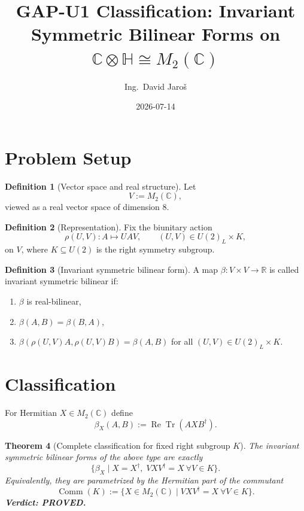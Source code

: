 \documentclass[12pt,a4paper]{article}
\title{GAP-U1 Classification: Invariant Symmetric Bilinear Forms on $\mathbb C\otimes\mathbb H\cong M_2(\mathbb C)$}
\author{Ing.\ David Jaroš}
\date{2026-07-14}
\newtheorem{theorem}{Theorem}[section]
\theoremstyle{definition}
\newtheorem{definition}[theorem]{Definition}
\theoremstyle{remark}
\begin{document}
\maketitle
\fi

\section{Problem Setup}

\begin{definition}[Vector space and real structure]
Let
\[
V := M_2(\mathbb C),
\]
viewed as a real vector space of dimension $8$.
\end{definition}

\begin{definition}[Representation]
Fix the biunitary action
\[
\rho(U,V):A\mapsto UAV,\qquad (U,V)\in U(2)_L\times K,
\]
on $V$, where $K\subseteq U(2)$ is the right symmetry subgroup.
\end{definition}

\begin{definition}[Invariant symmetric bilinear form]
A map $\beta:V\times V\to\mathbb R$ is called invariant symmetric bilinear if:
\begin{enumerate}
\item $\beta$ is real-bilinear,
\item $\beta(A,B)=\beta(B,A)$,
\item $\beta(\rho(U,V)A,\rho(U,V)B)=\beta(A,B)$ for all $(U,V)\in U(2)_L\times K$.
\end{enumerate}
\end{definition}

\section{Classification}

For Hermitian $X\in M_2(\mathbb C)$ define
\[
\beta_X(A,B):=\operatorname{Re}\operatorname{Tr}(A X B^\dagger).
\]

\begin{theorem}[Complete classification for fixed right subgroup $K$]
\label{thm:classification-main}
The invariant symmetric bilinear forms of the above type are exactly
\[
\{\beta_X\mid X=X^\dagger,\;VXV^\dagger=X\ \forall V\in K\}.
\]
Equivalently, they are parametrized by the Hermitian part of the commutant
\[
\operatorname{Comm}(K):=\{X\in M_2(\mathbb C)\mid VXV^\dagger=X\ \forall V\in K\}.
\]
\textbf{Verdict: PROVED.}
\end{theorem}
\end{document}
